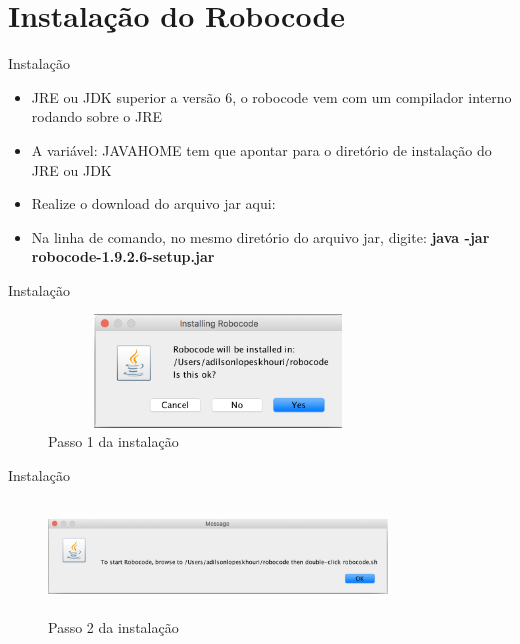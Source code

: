 \section{Instalação do Robocode}

\begin{frame}
	\begin{block}{Instalação}
		\begin{itemize}
			\item JRE ou JDK superior a versão 6, o robocode vem com um compilador interno rodando sobre o JRE

			\item A variável: JAVA\textunderscore HOME tem que apontar para o diretório de instalação do JRE ou JDK
			
			\item Realize o download do arquivo jar aqui: \href{https://sourceforge.net/projects/robocode/files/robocode/1.9.3.4/}{\color{blue}{Source Forge}} 
			
			\item Na linha de comando, no  mesmo diretório do arquivo jar, digite: \textbf{java -jar robocode-1.9.2.6-setup.jar}
						
		\end{itemize}
	\end{block}
\end{frame}


\begin{frame}
	\begin{block}{Instalação}
		 \begin{figure}[!htb]
			\centering	  				
			\includegraphics[height=3cm, width = 9cm]{./pic/instalacao01.png}
			\caption{Passo 1 da instalação}
			\label{fig_instalacao01}
		\end{figure}
	\end{block}
\end{frame}


\begin{frame}
	\begin{block}{Instalação}
		 \begin{figure}[!htb]
			\centering	  				
			\includegraphics[height=3cm, width = 9cm]{./pic/instalacao02.png}
			\caption{Passo 2 da instalação}
			\label{fig_instalacao02}
		\end{figure}
	\end{block}
\end{frame}



